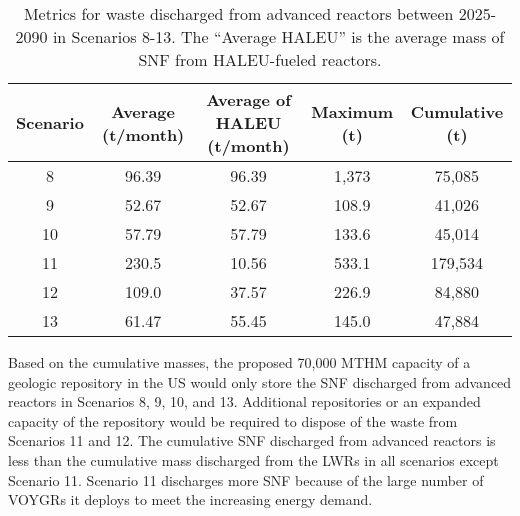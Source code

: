 \begin{table}[h!]
    \centering 
    \caption{Metrics for waste discharged from advanced reactors 
    between 2025-2090 in Scenarios 8-13. The ``Average \gls{HALEU}''
    is the average mass of \gls{SNF} from \gls{HALEU}-fueled 
    reactors. }
    \label{tab:1percent_waste}
    \begin{tabular}{c c c c c}
        \hline
        Scenario & Average (t/month) & Average of \gls{HALEU} (t/month) 
        & Maximum (t) & Cumulative (t)\\\hline
        8 & 96.39 & 96.39 & 1,373 & 75,085 \\
        9 & 52.67 & 52.67 & 108.9 & 41,026 \\
        10 & 57.79 & 57.79 & 133.6 & 45,014 \\
        11 & 230.5 & 10.56 & 533.1 & 179,534 \\
        12 & 109.0 & 37.57 & 226.9 & 84,880 \\
        13 & 61.47 & 55.45 & 145.0 & 47,884 \\
        \hline
    \end{tabular}
\end{table}

Based on the cumulative masses, the proposed 70,000 MTHM capacity of 
a geologic repository in the US would only store the \gls{SNF} 
discharged from advanced reactors in Scenarios 8, 9, 10, and 13. Additional 
repositories or an expanded capacity of the repository would be required 
to dispose of the waste from Scenarios 11 and 12. The 
cumulative \gls{SNF} discharged from advanced reactors is less than the 
cumulative mass discharged from the \glspl{LWR} in all scenarios except 
Scenario 11. Scenario 11 discharges more \gls{SNF} because of the large 
number of VOYGRs it deploys to meet the increasing energy demand. 

